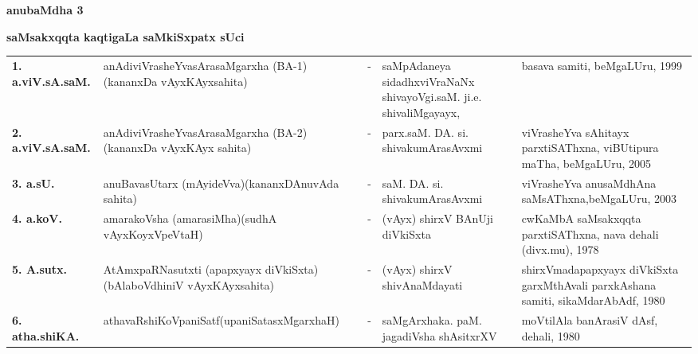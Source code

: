 \begin{center}
{\Huge\bfseries anubaMdha 3}

\vskip 1cm

{\large\bf saMsakxqqta kaqtigaLa saMkiSxpatx sUci}
\end{center}

{\renewcommand{\arraystretch}{1.3}
\tabcolsep=5pt
\begin{longtable}{@{}lp{5cm}cp{5cm}<{\raggedright}p{3cm}<{\raggedright}@{}}
\endfirsthead
\endhead
\endfoot
\endlastfoot
{\bf 1. a.viV.sA.saM.} &  anAdiviVrasheYvasArasaMgarxha (BA-1) (kananxDa vAyxKAyxsahita) &-& saMpAdaneya sidadhxviVraNaNx shivayoVgi.\newline saM. ji.e. shivaliMgayayx, & basava samiti, beMgaLUru, 1999\\
{\bf 2. a.viV.sA.saM.} & anAdiviVrasheYvasArasaMgarxha (BA-2) (kananxDa vAyxKAyx sahita) &-& parx.saM. DA. si. shivakumArasAvxmi & viVrasheYva sAhitayx parxtiSAThxna, viBUtipura maTha, beMgaLUru, 2005\\
{\bf 3. a.sU.} & anuBavasUtarx (mAyideVva)\newline (kananxDAnuvAda sahita) &-& saM. DA. si. shivakumArasAvxmi & viVrasheYva anusaMdhAna saMsAThxna,\newline beMgaLUru, 2003\\
{\bf 4. a.koV.} &  amarakoVsha (amarasiMha)\newline (sudhA vAyxKoyxVpeVtaH) &-& (vAyx) shirxV BAnUji diVkiSxta & cwKaMbA saMsakxqqta parxtiSAThxna, nava dehali (divx.mu), 1978\\
{\bf 5. A.sutx.} & AtAmxpaRNasutxti (apapxyayx diVkiSxta)\newline (bAlaboVdhiniV vAyxKAyxsahita) &-& (vAyx) shirxV shivAnaMdayati & shirxVmadapapxyayx diVkiSxta garxMthAvali parxkAshana samiti, sikaMdarAbAdf, 1980\\
{\bf 6. atha.shiKA.} & athavaRshiKoVpaniSatf\newline (upaniSatasxMgarxhaH) &-& saMgArxhaka. paM. jagadiVsha shAsitxrXV & moVtilAla banArasiV dAsf, dehali, 1980\\

\end{longtable}}

